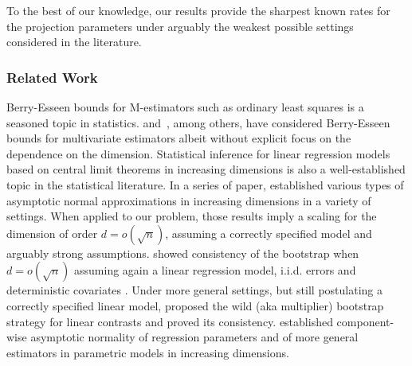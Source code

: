 \documentclass{article}
\begin{document}
 To the best of our knowledge, our results provide the sharpest known rates for the projection parameters under arguably the weakest possible settings considered in the  literature. 
 
 
 \subsubsection*{Related Work}
 Berry-Esseen bounds for M-estimators such as ordinary least squares is a seasoned topic in statistics. \cite{pfanzagl1973accuracy} and~\cite{paulauskas1996rates}, among others, have considered Berry-Esseen bounds for multivariate estimators albeit without explicit focus on the dependence on the dimension. 
 Statistical inference for linear regression models based on central limit theorems in increasing dimensions is also a well-established topic in the statistical literature. 
 In a series of paper, \cite{Portnoy84,Portnoy85,Portnoy86,Portnoy88} established 
 various types of asymptotic normal approximations in increasing dimensions in a variety of settings. When applied to our problem, those results imply a scaling for the dimension of order $d = o(\sqrt{n})$, assuming a correctly specified model and arguably strong assumptions.
 \cite{bickel1983bootstrapping}
 showed  consistency of the bootstrap
 when $d=o(\sqrt{n})$ assuming again a linear regression model, i.i.d. errors and deterministic covariates \cite{mammen1989}. Under more general settings, but still postulating a correctly specified linear model, \cite{mammen1993} proposed the wild (aka multiplier) bootstrap strategy \citep{liu1988} for linear contrasts and proved its consistency. \cite{He2000} \citep{welsh1989} established component-wise asymptotic normality of regression parameters and of more general estimators in parametric models in increasing dimensions. 
 
\end{document}
